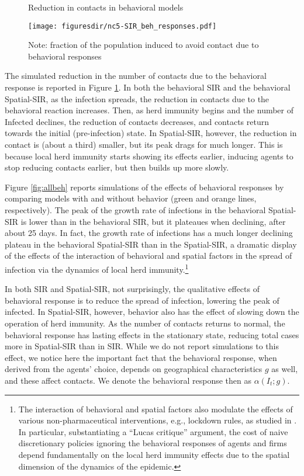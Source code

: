 \documentclass[english,11pt]{article}
\begin{document}
\begin{figure}
    \centering
    \caption{Reduction in contacts in behavioral models}
        \label{fig:behavioral}
        \texttt{[image: figuresdir/nc5-SIR\_beh\_responses.pdf]}
        \caption*{\normalfont \footnotesize Note: fraction of the population induced to avoid contact due to behavioral responses}
\end{figure}

The simulated   reduction in the number of contacts due to the behavioral response is reported in Figure  \ref{fig:behavioral}. \label{quotebehcomparison} In both the behavioral SIR and the behavioral Spatial-SIR, as the infection spreads, the reduction in contacts due to the behavioral reaction increases. Then, as herd immunity begins and the number of Infected 
declines, the reduction of contacts decreases, and contacts return towards the initial (pre-infection) state. In Spatial-SIR, however, the reduction in contact is (about a third) smaller, but its peak drags for much longer. This is because local herd immunity starts showing its effects earlier, inducing agents to stop reducing contacts earlier, but then builds up more slowly.  

 \label{behintro} Figure   \ref{fig:allbeh} %
 reports simulations of the effects of behavioral responses by comparing models with and without behavior (green and orange lines, respectively). The peak of the growth rate of infections in the behavioral Spatial-SIR is lower than in the behavioral SIR, but it plateaues when declining, after about 25 days. In fact, the growth rate of infections has a much longer declining plateau in the behavioral Spatial-SIR than in the Spatial-SIR, a dramatic display of the effects of the interaction of behavioral and spatial factors in the spread of infection via the dynamics of local herd immunity.\footnote{The interaction of behavioral and spatial factors also modulate the effects of various non-pharmaceutical interventions, e.g., lockdown rules, as studied in \cite{bisinmoro2020}. In particular, substantiating a ``Lucas critique'' argument, the cost of naive discretionary policies ignoring the behavioral responses of agents and firms depend fundamentally on the local herd immunity effects due to the spatial dimension of the dynamics of the epidemic.}  

In both SIR and Spatial-SIR, not surprisingly, the qualitative effects of behavioral response is to reduce the spread of infection, lowering the peak of infected. In Spatial-SIR, however, behavior also has the effect of slowing down the operation of herd immunity. As the number of contacts returns to normal, the behavioral response has lasting effects in the stationary state, reducing total cases more in Spatial-SIR than in SIR. While we do not report simulations to this effect, we notice here the important fact that the behavioral response, when derived from the agents' choice, depends on geographical characteristics $g$ as well, and these affect contacts. We denote the behavioral response then as $\alpha(I_t;g)$. 
\end{document}
